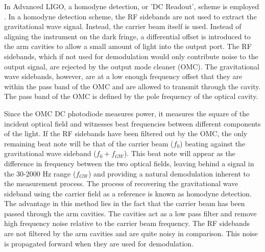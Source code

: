 In Advanced LIGO, a homodyne detection, or 'DC Readout', scheme is employed 
\cite{DCReadout}. 
In a homodyne detection scheme, the RF sidebands are not used to extract the 
gravitational wave signal. Instead, the carrier beam itself is used. Instead of 
aligning the instrument on the dark fringe, a differential offset is introduced 
to the arm cavities to allow a small amount of light into the output port. 
The RF sidebands, which if not used for demodulation would only contribute 
noise to the output signal, 
are rejected by the output mode cleaner (OMC). 
The gravitational wave sidebands, however, are at a 
low enough frequency offset that they are within the pass band of the OMC 
and are allowed to transmit through the cavity. The pass band of the OMC 
is defined by the pole frequency of the optical cavity.

Since the OMC DC photodiode measures power, it measures the square of the 
incident optical field and witnesses beat frequencies between different 
components of the light. If the RF sidebands have been filtered out by 
the OMC, the only remaining beat note will be that of the carrier beam ($f_0$) 
beating against the gravitational wave sideband ($f_0 + f_{GW}$). This beat note will 
appear as the difference in frequency between the two optical fields, 
leaving behind a signal in the 30-2000 Hz range ($f_{GW}$) and providing a 
natural demodulation inherent to the measurement process. 
The process of recovering the gravitational wave sideband using the 
carrier field as a reference is known as homodyne detection. The 
advantage in this method lies in the fact that the carrier beam 
has been passed through the arm cavities. The cavities act as a low 
pass filter and remove high frequency noise relative to the carrier 
beam frequency. The RF sidebands are not filtered by the arm cavities and 
are quite noisy in comparison. This 
noise is propagated forward when they are used for demodulation. 

